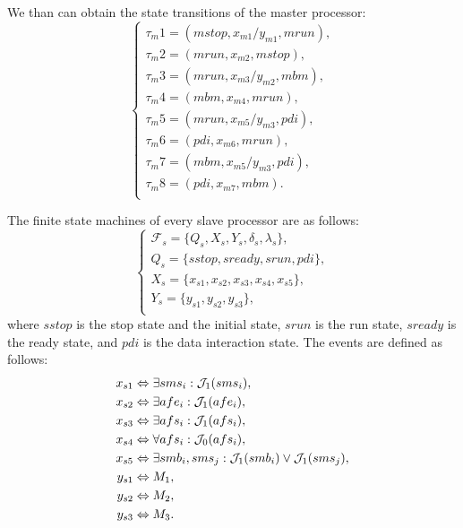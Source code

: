 \documentclass[journal,UTF8]{IEEEtran}
\begin{document}
We than can obtain the state transitions of the master processor:
  \begin{equation}
 \left\{
 \begin{array}{l}
 \tau_m1 = (mstop, x_{m1}/y_{m1}, mrun),\\
 \tau_m2 = (mrun, x_{m2}, mstop),\\
 \tau_m3 = (mrun, x_{m3}/y_{m2}, mbm),\\
 \tau_m4 = (mbm, x_{m4}, mrun),\\
 \tau_m5 = (mrun, x_{m5}/y_{m3}, pdi),\\
 \tau_m6 = (pdi, x_{m6}, mrun),\\
 \tau_m7 = (mbm, x_{m5}/y_{m3}, pdi),\\
 \tau_m8 = (pdi, x_{m7}, mbm).\\
 \end{array}
 \right.
 \end{equation}
 
 
 The finite state machines of every slave processor are as follows:
 \begin{equation}
 \label{FSlave}
 \left\{
 \begin{array}{l}
 \mathcal{F}_{s} = \{Q_s, X_s, Y_s, \delta_s, \lambda_s\},\\
 Q_s = \{sstop, sready, srun, pdi\},\\
 X_s = \{x_{s1}, x_{s2}, x_{s3}, x_{s4}, x_{s5}\},\\
 Y_s = \{y_{s1}, y_{s2}, y_{s3}\},\\
 \end{array}
 \right.
 \end{equation}
 where $sstop$ is the stop state and the initial state, $srun$ is the run state, $sready$ is the ready state, and $pdi$ is the data interaction state. The events are defined as follows:
\begin{align}
\notag x_{s1}&\Leftrightarrow \exists sms_i: \mathcal{J}_1(sms_i),\\
\notag x_{s2}&\Leftrightarrow \exists afe_i: \mathcal{J}_1(afe_i),\\
\notag x_{s3}&\Leftrightarrow \exists afs_i: \mathcal{J}_1(afs_i),\\
\notag x_{s4}&\Leftrightarrow \forall afs_i: \mathcal{J}_0(afs_i),\\
\notag x_{s5}&\Leftrightarrow \exists smb_i, sms_j: \mathcal{J}_1(smb_i) \lor \mathcal{J}_1(sms_j),\\
\notag y_{s1}&\Leftrightarrow M_1,\\
\notag y_{s2}&\Leftrightarrow M_2,\\
\notag y_{s3}&\Leftrightarrow M_3.
\end{align}
\end{document}

